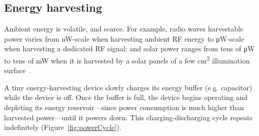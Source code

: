 




\subsection{Energy harvesting}
Ambient energy is volatile, and scarce. For example, radio waves harvestable power varies from \si{\nano\watt}-scale when harvesting ambient RF energy to \si{\uW}-scale when harvesting a dedicated RF signal; and solar power ranges from tens of \si{\uW} to tens of \si{\mW} when it is harvested by a solar panels of a few \si{\cm^2} illumination surface~\cite{lucia2017intermittent,rao2017ambient}.%

A tiny energy-harvesting device slowly charges its energy buffer (e.g. capacitor) while the device is off. Once the buffer is full, the device begins operating and depleting its energy reservoir---since power consumption is much higher than harvested power---until it powers down. This charging-discharging cycle repeats indefinitely (Figure~\ref{fig:powerCycle}). 

